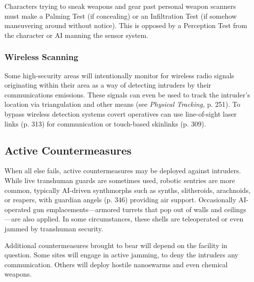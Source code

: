 Characters trying to sneak weapons and gear past 
personal weapon scanners must make a Palming
Test (if concealing) or an Infiltration
Test (if somehow maneuvering around 
without notice). This is opposed by a 
Perception Test from the character or 
AI manning the sensor system.

\subsubsection{Wireless Scanning}

Some high-security areas will intentionally
monitor for wireless
radio signals originating within 
their area as a way of detecting
intruders by their communications
emissions. These
signals can even be used to 
track the intruder's location via 
triangulation and other means 
(see  \textit{Physical Tracking,} p. 251). 
To bypass wireless detection systems
covert operatives can use
line-of-sight laser links (p. 313) 
for communication or touch-based 
skinlinks (p. 309).

\subsection{Active Countermeasures}

When all else fails, active countermeasures
may be deployed against
intruders. While live transhuman
guards are sometimes
used, robotic sentries are more 
common, typically AI-driven 
synthmorphs such as synths, 
slitheroids, arachnoids, or 
reapers, with guardian angels 
(p. 346) providing air support. 
Occasionally AI-operated gun 
emplacements—armored turrets
that pop out of walls and
ceilings—are also applied. In 
some circumstances, these shells 
are teleoperated or even jammed 
by transhuman security.

Additional countermeasures 
brought to bear will depend on the facility
in question. Some sites will engage in
active jamming, to deny the intruders any 
communication. Others will deploy hostile 
nanoswarms and even chemical weapons.